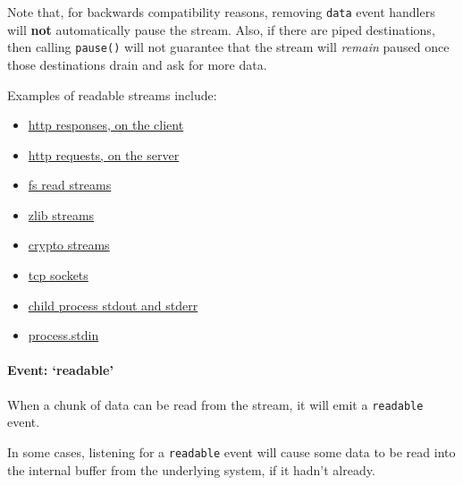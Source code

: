 Note that, for backwards compatibility reasons, removing
\texttt{\textquotesingle{}data\textquotesingle{}} event handlers will
\textbf{not} automatically pause the stream. Also, if there are piped
destinations, then calling \texttt{pause()} will not guarantee that the
stream will \emph{remain} paused once those destinations drain and ask
for more data.

Examples of readable streams include:

\begin{itemize}
\itemsep1pt\parskip0pt
\item
  \href{http.html\#http_http_incomingmessage}{http responses, on the
  client}
\item
  \href{http.html\#http_http_incomingmessage}{http requests, on the
  server}
\item
  \href{fs.html\#fs_class_fs_readstream}{fs read streams}
\item
  \href{zlib.html}{zlib streams}
\item
  \href{crypto.html}{crypto streams}
\item
  \href{net.html\#net_class_net_socket}{tcp sockets}
\item
  \href{child_process.html\#child_process_child_stdout}{child process
  stdout and stderr}
\item
  \href{process.html\#process_process_stdin}{process.stdin}
\end{itemize}

\paragraph{\texorpdfstring{Event:
`readable'}{Event: readable}}\label{event-readable}

When a chunk of data can be read from the stream, it will emit a
\texttt{\textquotesingle{}readable\textquotesingle{}} event.

In some cases, listening for a
\texttt{\textquotesingle{}readable\textquotesingle{}} event will cause
some data to be read into the internal buffer from the underlying
system, if it hadn't already.

\begin{Shaded}
\begin{Highlighting}[]
 \NormalTok{();}
\NormalTok{(}\NormalTok{, }\NormalTok{() \{}
\NormalTok{\});}
\end{Highlighting}
\end{Shaded}

